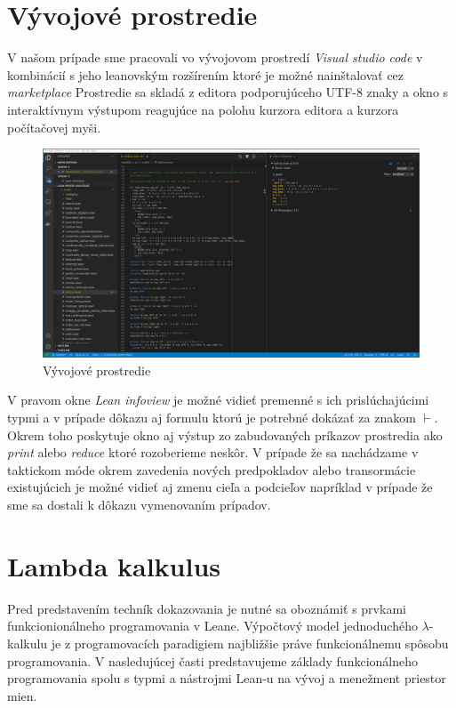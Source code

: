 \documentclass[a4paper,10pt,oneside]{report}%
\begin{document}
\section{Vývojové prostredie}
    V našom prípade sme pracovali vo vývojovom prostredí \emph{Visual studio code}
v kombinácií s jeho leanovským rozšírením ktoré je možné nainštalovať cez
\emph{marketplace} Prostredie sa skladá z editora podporujúceho UTF-8 znaky a okno s
interaktívnym výstupom reagujúce na polohu kurzora editora a kurzora počítačovej
myši.
\begin{center}
    \begin{figure}[!ht]
        \centering
        \includegraphics[scale=0.25]{vscode_printscreen.png}
        \caption{Vývojové prostredie}
    \end{figure}
\end{center}
    V pravom okne \emph{Lean infoview} je možné vidieť premenné s ich prislúchajúcimi
typmi a v prípade dôkazu aj formulu ktorú je potrebné dokázať za znakom $\vdash$.
    Okrem toho poskytuje okno aj výstup zo zabudovaných príkazov prostredia
ako \emph{print} alebo \emph{reduce} ktoré rozoberieme neskôr.
    V prípade že sa nachádzame v taktickom móde okrem zavedenia nových predpokladov
alebo transormácie existujúcich je možné vidieť aj zmenu cieľa a podcieľov
napríklad v prípade že sme sa dostali k dôkazu vymenovaním prípadov.
\section{Lambda kalkulus}
Pred predstavením techník dokazovania je nutné sa oboznámiť s prvkami funkcionionálneho
    programovania v Leane.
Výpočtový model jednoduchého $\lambda$-kalkulu je z programovacích paradigiem najbližšie
práve funkcionálnemu spôsobu programovania.
V nasledujúcej časti predstavujeme základy funkcionálneho programovania spolu
    s typmi a nástrojmi Lean-u na vývoj a menežment priestor mien.
\end{document}
